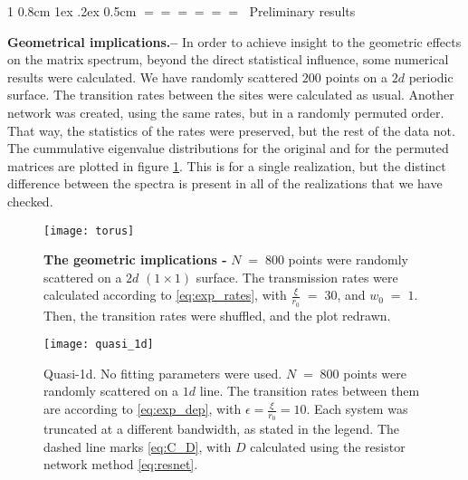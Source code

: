 \documentclass[onecolumn,fleqn,notitlepage,secnumarabic]{revtex4}
\makeatletter
\def\section{%
  \@startsection
    {section}%
    {1}%
    {\z@}%
    {0.8cm \@plus1ex \@minus .2ex}%
    {0.5cm}%
    {\Large\bf $=\!=\!=\!=\!=\!=\;$}%
}%
\makeatother
\begin{document}
\section{Preliminary results} \label{sec:prelim}

{ \bf Geometrical implications.-- } In order to achieve insight to the geometric effects on the matrix spectrum, beyond the direct statistical influence, some numerical results were calculated. We have randomly scattered $200$ points on a $2d$ periodic surface. The transition rates between the sites were calculated as usual. Another network was created, using the same rates, but in a randomly permuted order. That way, the statistics of the rates were preserved, but the rest of the data not. The cummulative eigenvalue distributions for the original and for the permuted matrices are plotted in figure \ref{fig:torus}. This is for a single realization, but the distinct difference between the spectra is present in all of the realizations that we have checked.

\begin{figure}
    \texttt{[image: torus]}
    \caption{{ \bf The geometric implications -} $N\;=\;800$ points were randomly scattered on a $2d$ $(1\times 1)$ surface. The transmission rates were calculated according to \eqref{eq:exp_rates}, with $\frac{\xi}{r_0} \;=\; 30$, and $w_0\;=\;1$. Then, the transition rates were shuffled, and the plot redrawn.}
    \label{fig:torus}
\end{figure}



\begin{figure}
    \texttt{[image: quasi\_1d]}
    \caption{Quasi-1d. No fitting parameters were used. $N\;=\;800$ points were randomly scattered on a $1d$ line. The transition rates between them are according to \eqref{eq:exp_dep}, with $\epsilon=\frac{\xi}{r_0}=10$. Each system was truncated at a different bandwidth, as stated in the legend. The dashed line marks \eqref{eq:C_D}, with $D$ calculated using the resistor network method \eqref{eq:resnet}. }
    \label{fig:quasi_1d}
\end{figure}
\end{document}
